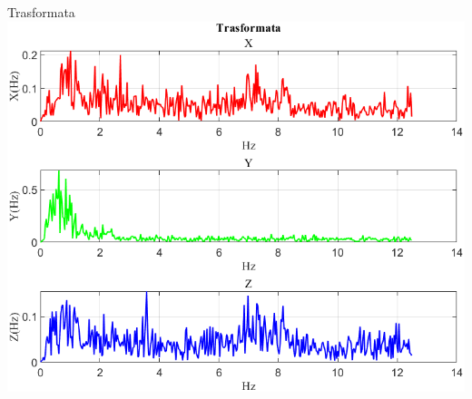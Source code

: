 \documentclass[beamer]{standalone}
\begin{document}
	
	
	
	
	
	\begin{frame}{{Trasformata}}
		\centering\includegraphics[height=.8\textheight]{figure/Mag/Trasformata/Trasformata}
	\end{frame}
	
\end{document}
